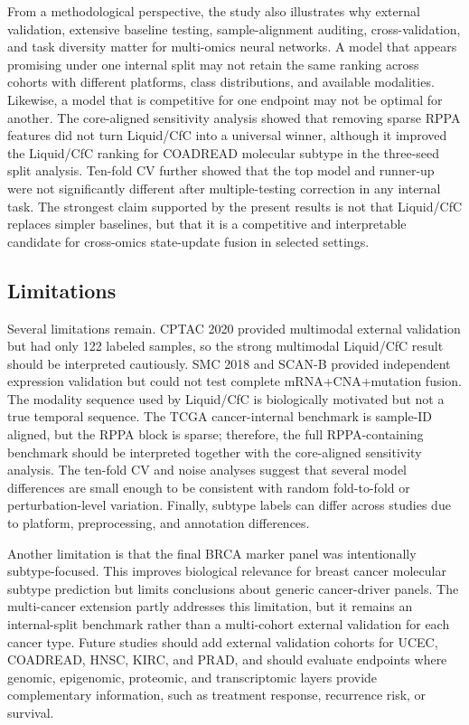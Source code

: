 From a methodological perspective, the study also illustrates why external validation, extensive baseline testing, sample-alignment auditing, cross-validation, and task diversity matter for multi-omics neural networks. A model that appears promising under one internal split may not retain the same ranking across cohorts with different platforms, class distributions, and available modalities. Likewise, a model that is competitive for one endpoint may not be optimal for another. The core-aligned sensitivity analysis showed that removing sparse RPPA features did not turn Liquid/CfC into a universal winner, although it improved the Liquid/CfC ranking for COADREAD molecular subtype in the three-seed split analysis. Ten-fold CV further showed that the top model and runner-up were not significantly different after multiple-testing correction in any internal task. The strongest claim supported by the present results is not that Liquid/CfC replaces simpler baselines, but that it is a competitive and interpretable candidate for cross-omics state-update fusion in selected settings.

\subsection{Limitations}

Several limitations remain. CPTAC 2020 provided multimodal external validation but had only 122 labeled samples, so the strong multimodal Liquid/CfC result should be interpreted cautiously. SMC 2018 and SCAN-B provided independent expression validation but could not test complete mRNA+CNA+mutation fusion. The modality sequence used by Liquid/CfC is biologically motivated but not a true temporal sequence. The TCGA cancer-internal benchmark is sample-ID aligned, but the RPPA block is sparse; therefore, the full RPPA-containing benchmark should be interpreted together with the core-aligned sensitivity analysis. The ten-fold CV and noise analyses suggest that several model differences are small enough to be consistent with random fold-to-fold or perturbation-level variation. Finally, subtype labels can differ across studies due to platform, preprocessing, and annotation differences.

Another limitation is that the final BRCA marker panel was intentionally subtype-focused. This improves biological relevance for breast cancer molecular subtype prediction but limits conclusions about generic cancer-driver panels. The multi-cancer extension partly addresses this limitation, but it remains an internal-split benchmark rather than a multi-cohort external validation for each cancer type. Future studies should add external validation cohorts for UCEC, COADREAD, HNSC, KIRC, and PRAD, and should evaluate endpoints where genomic, epigenomic, proteomic, and transcriptomic layers provide complementary information, such as treatment response, recurrence risk, or survival.


